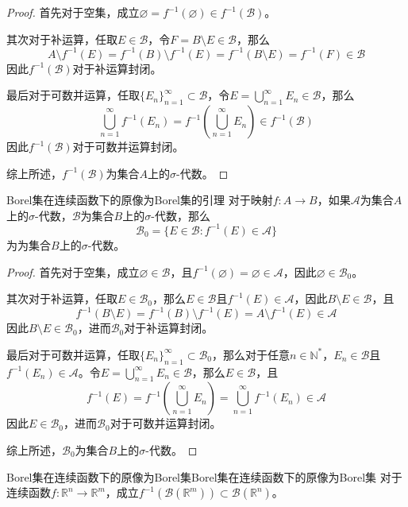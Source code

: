 \documentclass[lang = cn, scheme = chinese, thmcnt = section]{elegantbook}
\newcommand{\N}{\mathbb{N}}            %
\newcommand{\R}{\mathbb{R}}            %
\newcommand{\sub}{\subset}             %
\newcommand{\dis}{\displaystyle}
\begin{document}
\begin{proof}
	首先对于空集，成立$\varnothing=f^{-1}(\varnothing)\in f^{-1}(\mathscr{B})$。
	
	其次对于补运算，任取$E\in \mathscr{B}$，令$F=B\setminus E\in \mathscr{B}$，那么%
	$$
	A\setminus f^{-1}(E)
	=f^{-1}(B)\setminus f^{-1}(E)
	=f^{-1}(B\setminus E)
	=f^{-1}(F)\in \mathscr{B}
	$$
	因此$f^{-1}(\mathscr{B})$对于补运算封闭。
	
	最后对于可数并运算，任取$\{E_n\}_{n=1}^{\infty}\sub\mathscr{B}$，令$\dis E=\bigcup_{n=1}^{\infty}E_n\in \mathscr{B}$，那么%
	$$
	\bigcup_{n=1}^{\infty}f^{-1}(E_n)
	=f^{-1}\left(\bigcup_{n=1}^{\infty}E_n\right)
	\in f^{-1}(\mathscr{B})
	$$
	因此$f^{-1}(\mathscr{B})$对于可数并运算封闭。
	
	综上所述，$f^{-1}(\mathscr{B})$为集合$A$上的$\sigma$-代数。
\end{proof}

\begin{lemma}{}{Borel集在连续函数下的原像为Borel集的引理}
	对于映射$f:A\to B$，如果$\mathscr{A}$为集合$A$上的$\sigma$-代数，$\mathscr{B}$为集合$B$上的$\sigma$-代数，那么%
	$$
	\mathscr{B}_0=\{ E\in \mathscr{B}:f^{-1}(E)\in \mathscr{A} \}
	$$
	为为集合$B$上的$\sigma$-代数。
\end{lemma}

\begin{proof}
	首先对于空集，成立$\varnothing\in\mathscr{B}$，且$f^{-1}(\varnothing)=\varnothing\in\mathscr{A}$，因此$\varnothing\in \mathscr{B}_0$。
	
	其次对于补运算，任取$E\in \mathscr{B}_0$，那么$E\in \mathscr{B}$且$f^{-1}(E)\in\mathscr{A}$，因此$B\setminus E\in \mathscr{B}$，且%
	$$
	f^{-1}(B\setminus E)=f^{-1}(B)\setminus f^{-1}(E)
	=A\setminus f^{-1}(E)\in \mathscr{A}
	$$
	因此$B\setminus E\in \mathscr{B}_0$，进而$\mathscr{B}_0$对于补运算封闭。
	
	最后对于可数并运算，任取$\{E_n\}_{n=1}^{\infty}\sub \mathscr{B}_0$，那么对于任意$n\in\N^*$，$E_n\in \mathscr{B}$且$f^{-1}(E_n)\in \mathscr{A}$。令$\dis E=\bigcup_{n=1}^{\infty}E_n\in \mathscr{B}$，那么$E\in \mathscr{B}$，且%
	$$
	f^{-1}(E)
	=f^{-1}\left(\bigcup_{n=1}^{\infty}E_n\right)
	=\bigcup_{n=1}^{\infty}f^{-1}(E_n)
	\in \mathscr{A}
	$$
	因此$E\in \mathscr{B}_0$，进而$\mathscr{B}_0$对于可数并运算封闭。
	
	综上所述，$\mathscr{B}_0$为集合$B$上的$\sigma$-代数。
\end{proof}

\begin{theorem}{Borel集在连续函数下的原像为Borel集}{Borel集在连续函数下的原像为Borel集}
	对于连续函数$f:\R^n\to \R^m$，成立$f^{-1}(\mathscr{B}(\R^m))\sub \mathscr{B}(\R^n)$。
\end{theorem}
\end{document}
